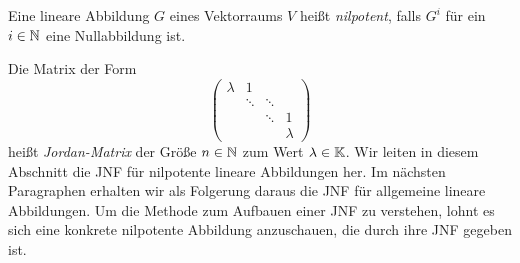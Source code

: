 Eine lineare Abbildung $ G $ eines Vektorraums $ V $ heißt \emph{nilpotent}, falls $ G^i $ für ein $ i \in \mathbb N $ eine Nullabbildung ist. 

Die Matrix der Form
\begin{equation*}
	\begin{pmatrix}
		\lambda & 1 && \\
		& \ddots & \ddots & \\
		&& \ddots & 1 \\
		&&& \lambda
	\end{pmatrix}
\end{equation*}
heißt \emph{Jordan-Matrix} der Größe $ n \in \mathbb N $ zum Wert $ \lambda \in \mathbb K $. Wir leiten in diesem Abschnitt die JNF für nilpotente lineare Abbildungen her. Im nächsten Paragraphen erhalten wir als Folgerung daraus die JNF für allgemeine lineare Abbildungen. Um die Methode zum Aufbauen einer JNF zu verstehen, lohnt es sich eine konkrete nilpotente Abbildung anzuschauen, die durch ihre JNF gegeben ist. 

